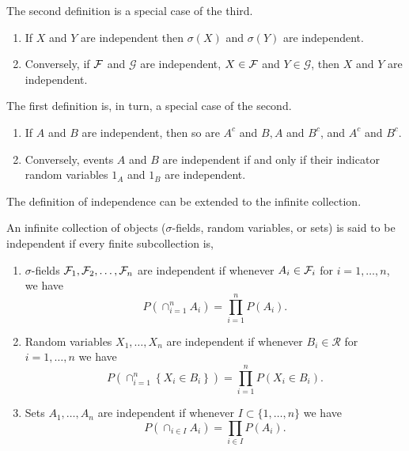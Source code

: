 The second definition is a special case of the third.

\begin{theorem}
	\begin{enumerate}
		\item If \(X\) and \(Y\) are independent then \(\sigma(X)\) and \(\sigma(Y)\) are independent.
		\item Conversely, if \(\mathcal{F}\) and \(\mathcal{G}\) are independent, \(X\in\mathcal{F}\) and \(Y\in\mathcal{G}\), then \(X\) and \(Y\) are independent.
	\end{enumerate}
\end{theorem}

The first definition is, in turn, a special case of the second.

\begin{theorem}
	\begin{enumerate}
		\item If \(A\) and \(B\) are independent, then so are \(A^{c}\) and \(B, A\) and \(B^{c}\), and \(A^{c}\) and \(B^{c}\).
		\item Conversely, events \(A\) and \(B\) are independent if and only if their indicator random variables \(1_{A}\) and \(1_{B}\) are independent.
	\end{enumerate}
\end{theorem}

The definition of independence can be extended to the infinite collection.

\begin{definition}
	An infinite collection of objects (\(\sigma\)-fields, random variables, or sets) is said to be independent if every finite subcollection is,
	\begin{enumerate}
		\item \(\sigma\)-fields \(\mathcal{F}_{1},\mathcal{F}_{2},\ldots,\mathcal{F}_{n}\) are independent if whenever \(A_{i}\in\mathcal{F}_{i}\) for \(i=1, \ldots,n\), we have
		      \begin{equation}
			      P\left(\cap_{i=1}^{n}A_{i}\right)=\prod_{i=1}^{n}P\left(A_{i}\right).
		      \end{equation}
		\item Random variables \(X_{1},\ldots,X_{n}\) are independent if whenever \(B_{i}\in\mathcal{R}\) for \(i=1,\ldots,n\) we have
		      \begin{equation}
			      P\left(\cap_{i=1}^{n}\left\{X_{i}\in B_{i}\right\}\right)=\prod_{i=1}^{n}P\left(X_{i}\in B_{i}\right).
		      \end{equation}
		\item Sets \(A_{1},\ldots,A_{n}\) are independent if whenever \(I\subset\{1,\ldots,n\}\) we have
		      \begin{equation}
			      P\left(\cap_{i\in I}A_{i}\right)=\prod_{i\in I}P\left(A_{i}\right).
		      \end{equation}
	\end{enumerate}
\end{definition}

